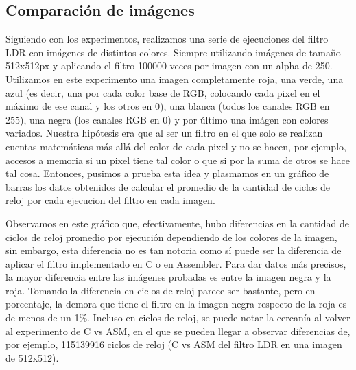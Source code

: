 \documentclass[a4paper]{article}
\begin{document}
\subsection{Comparación de imágenes}
Siguiendo con los experimentos, realizamos una serie de ejecuciones del filtro LDR con imágenes de distintos colores. Siempre utilizando imágenes de
tamaño 512x512px y aplicando el filtro 100000 veces por imagen con un alpha de 250. Utilizamos en este experimento una imagen completamente roja, una verde, una azul (es decir,
una por cada color base de RGB, colocando cada pixel en el máximo de ese canal y los otros en 0), una blanca (todos los canales RGB en 255), una negra
(los canales RGB en 0) y por último una imágen con colores variados. Nuestra hipótesis era que al ser un filtro en el que solo se realizan cuentas matemáticas
más allá del color de cada pixel y no se hacen, por ejemplo, accesos a memoria si un pixel tiene tal color o que si por la suma de otros se hace tal cosa. Entonces,
pusimos a prueba esta idea y plasmamos en un gráfico de barras los datos obtenidos de calcular el promedio de la cantidad de ciclos de reloj por cada ejecucion del filtro
en cada imagen.

\begin{figure}[!ht]
    \centering
    \begin{floatrow}
    \end{floatrow}
\end{figure}

Observamos en este gráfico que, efectivamente, hubo diferencias en la cantidad de ciclos de reloj promedio por ejecución dependiendo de los colores de la imagen,
sin embargo, esta diferencia no es tan notoria como sí puede ser la diferencia de aplicar el filtro implementado en C o en Assembler.
Para dar datos más precisos, la mayor diferencia entre las imágenes probadas es entre la imagen negra y la roja. Tomando la diferencia en ciclos de reloj
parece ser bastante, pero en porcentaje, la demora que tiene el filtro en la imagen negra respecto de la roja es de menos de un 1\%.
Incluso en ciclos de reloj, se puede notar la cercanía al volver al experimento de C vs ASM, en el que se pueden llegar a observar diferencias de, por ejemplo,
 115139916 ciclos de reloj (C vs ASM del filtro LDR en una imagen de 512x512).
\end{document}
